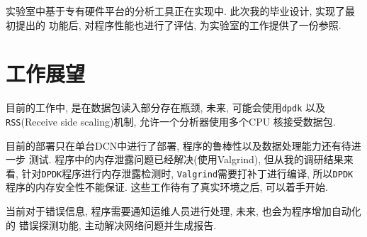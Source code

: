   实验室中基于专有硬件平台的分析工具正在实现中. 此次我的毕业设计, 实现了最初提出的
功能后, 对程序性能也进行了评估, 为实验室的工作提供了一份参照.

\section{工作展望}

  目前的工作中, 是在数据包读入部分存在瓶颈, 未来, 可能会使用\texttt{dpdk}
以及\texttt{RSS}(Receive side scaling)\cite{rss}机制, 允许一个分析器使用多个CPU
核接受数据包.

  目前的部署只在单台DCN中进行了部署, 程序的鲁棒性以及数据处理能力还有待进一步
测试. 程序中的内存泄露问题已经解决(使用Valgrind\cite{Valgrind}),
但从我的调研结果来看, 针对\texttt{DPDK}程序进行内存泄露检测时,
\texttt{Valgrind}需要打补丁进行编译, 所以\texttt{DPDK}程序的内存安全性不能保证.
这些工作待有了真实环境之后, 可以着手开始.

  当前对于错误信息, 程序需要通知运维人员进行处理, 未来, 也会为程序增加自动化的
错误探测功能, 主动解决网络问题并生成报告.
